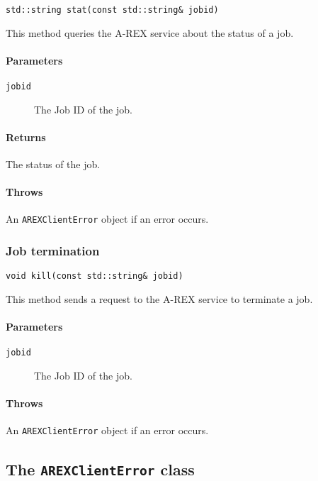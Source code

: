 \begin{shaded}
\verb#std::string stat(const std::string& jobid)#
\end{shaded}

This method queries the A-REX service about the status of a
job.

\paragraph{Parameters}
\begin{description}
\item[\texttt{jobid}] The Job ID of the job.
\end{description}

\paragraph{Returns}
The status of the job.

\paragraph{Throws}
An \verb:AREXClientError: object if an error occurs.      


\subsubsection{Job termination}

\begin{shaded}
\verb#void kill(const std::string& jobid)#
\end{shaded}

This method sends a request to the A-REX service to terminate a job.

\paragraph{Parameters}
\begin{description}
\item[\texttt{jobid}] The Job ID of the job.
\end{description}

\paragraph{Throws}
An \verb:AREXClientError: object if an error occurs.      


\subsection{The \texttt{AREXClientError} class}

